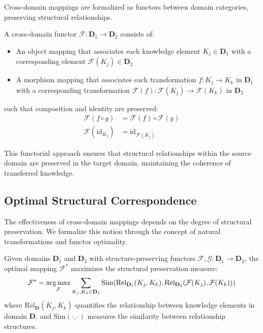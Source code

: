 Cross-domain mappings are formalized as functors between domain categories, preserving structural relationships.

\begin{definition}
A cross-domain functor $\mathcal{F}: \mathbf{D}_1 \rightarrow \mathbf{D}_2$ consists of:
\begin{itemize}
    \item An object mapping that associates each knowledge element $K_j \in \mathbf{D}_1$ with a corresponding element $\mathcal{F}(K_j) \in \mathbf{D}_2$
    \item A morphism mapping that associates each transformation $f: K_j \rightarrow K_k$ in $\mathbf{D}_1$ with a corresponding transformation $\mathcal{F}(f): \mathcal{F}(K_j) \rightarrow \mathcal{F}(K_k)$ in $\mathbf{D}_2$
\end{itemize}
such that composition and identity are preserved:
\begin{align}
\mathcal{F}(f \circ g) &= \mathcal{F}(f) \circ \mathcal{F}(g) \\
\mathcal{F}(\text{id}_{K_j}) &= \text{id}_{\mathcal{F}(K_j)}
\end{align}
\end{definition}

This functorial approach ensures that structural relationships within the source domain are preserved in the target domain, maintaining the coherence of transferred knowledge.

\subsection{Optimal Structural Correspondence}

The effectiveness of cross-domain mappings depends on the degree of structural preservation. We formalize this notion through the concept of natural transformations and functor optimality.

\begin{theorem}
Given domains $\mathbf{D}_1$ and $\mathbf{D}_2$ with structure-preserving functors $\mathcal{F}, \mathcal{G}: \mathbf{D}_1 \rightarrow \mathbf{D}_2$, the optimal mapping $\mathcal{F}^*$ maximizes the structural preservation measure:
\begin{equation}
\mathcal{F}^* = \mathop{\mathrm{arg\,max}}_{\mathcal{F}} \sum_{K_j, K_k \in \mathbf{D}_1} \text{Sim}(\text{Rel}_{\mathbf{D}_1}(K_j, K_k), \text{Rel}_{\mathbf{D}_2}(\mathcal{F}(K_j), \mathcal{F}(K_k)))
\end{equation}
where $\text{Rel}_{\mathbf{D}}(K_j, K_k)$ quantifies the relationship between knowledge elements in domain $\mathbf{D}$, and $\text{Sim}(\cdot,\cdot)$ measures the similarity between relationship structures.
\end{theorem}

